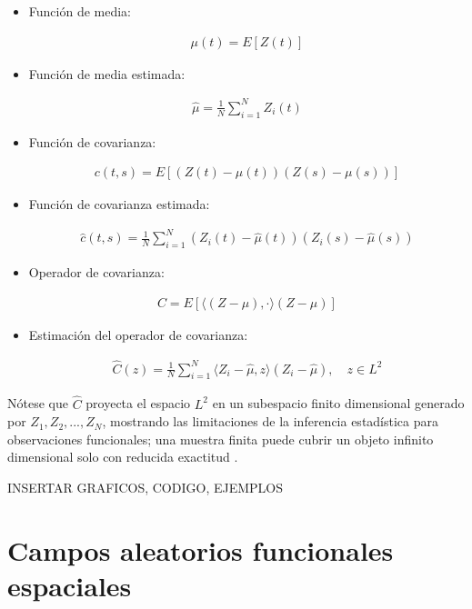 \documentclass[
]{book}
\begin{document}
\begin{itemize}
\item
  Función de media:

  \begin{align*}
        \mu(t)=E[Z(t)]
    \end{align*}
\item
  Función de media estimada:

  \begin{align*}
        \hat{\mu}=\frac{1}{N}\sum_{i=1}^N Z_i(t)
    \end{align*}
\item
  Función de covarianza:

  \begin{align*}
        c(t,s)=E[(Z(t)-\mu(t))(Z(s)-\mu(s))]
    \end{align*}
\item
  Función de covarianza estimada:

  \begin{align*}
        \hat{c}(t,s)=\frac{1}{N}\sum_{i=1}^N(Z_i(t)-\hat{\mu}(t))(Z_i(s)-\hat{\mu}(s))
    \end{align*}
\item
  Operador de covarianza:

  \begin{align*}
        C=E[\langle(Z-\mu),\cdot \rangle (Z-\mu)]
    \end{align*}
\item
  Estimación del operador de covarianza:

  \begin{align*}
        \hat{C}(z)= \frac{1}{N} \sum_{i=1}^{N} \langle Z_i - \hat{\mu}, z\rangle ( Z_i-\hat{\mu}), \quad z\in L^2
    \end{align*}
\end{itemize}

Nótese que \(\hat{C}\) proyecta el espacio \(L^2\) en un subespacio finito dimensional generado por \(Z_1,Z_2,...,Z_N\), mostrando las limitaciones de la inferencia estadística para observaciones funcionales; una muestra finita puede cubrir un objeto infinito dimensional solo con reducida exactitud \citep{lajos}.

{INSERTAR GRAFICOS, CODIGO, EJEMPLOS}

\hypertarget{campos-aleatorios-funcionales-espaciales}{%
\section{Campos aleatorios funcionales espaciales}\label{campos-aleatorios-funcionales-espaciales}}
\end{document}
